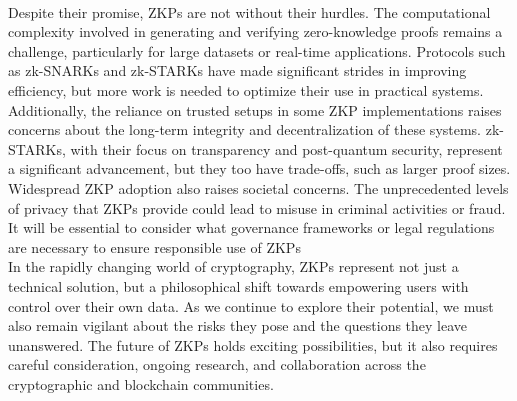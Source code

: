 \\
Despite their promise, ZKPs are not without their hurdles. The computational complexity involved in generating and verifying zero-knowledge proofs remains a challenge, particularly for large datasets or real-time applications. Protocols such as zk-SNARKs and zk-STARKs have made significant strides in improving efficiency, but more work is needed to optimize their use in practical systems. Additionally, the reliance on trusted setups in some ZKP implementations raises concerns about the long-term integrity and decentralization of these systems. zk-STARKs, with their focus on transparency and post-quantum security, represent a significant advancement, but they too have trade-offs, such as larger proof sizes. Widespread ZKP adoption also raises societal concerns. The unprecedented levels of privacy that ZKPs provide could lead to misuse in criminal activities or fraud. It will be essential to consider what governance frameworks or legal regulations are necessary to ensure responsible use of ZKPs
\\
In the rapidly changing world of cryptography, ZKPs represent not just a technical solution, but a philosophical shift towards empowering users with control over their own data. As we continue to explore their potential, we must also remain vigilant about the risks they pose and the questions they leave unanswered. The future of ZKPs holds exciting possibilities, but it also requires careful consideration, ongoing research, and collaboration across the cryptographic and blockchain communities.